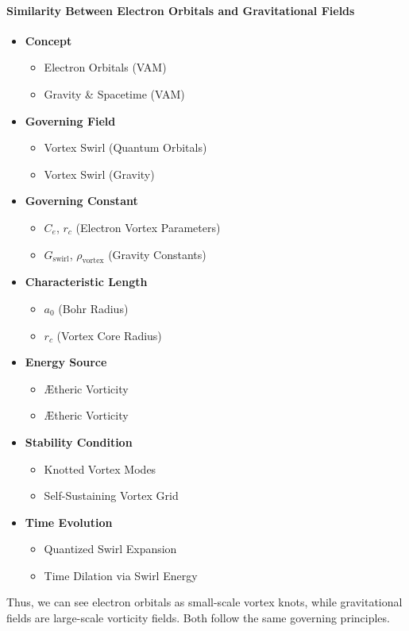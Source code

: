 \documentclass[a4paper,10pt]{article}
\begin{document}
\paragraph{Similarity Between Electron Orbitals and Gravitational Fields}
\begin{itemize}
    \item \textbf{Concept}
    \begin{itemize}
        \item Electron Orbitals (VAM)
        \item Gravity \& Spacetime (VAM)
    \end{itemize}
    \item \textbf{Governing Field}
    \begin{itemize}
        \item Vortex Swirl (Quantum Orbitals)
        \item Vortex Swirl (Gravity)
    \end{itemize}
    \item \textbf{Governing Constant}
    \begin{itemize}
        \item $C_e$, $r_c$ (Electron Vortex Parameters)
        \item $ G_\text{swirl}$, $\rho_\text{vortex}$ (Gravity Constants)
    \end{itemize}
    \item \textbf{Characteristic Length}
    \begin{itemize}
        \item $a_0$ (Bohr Radius)
        \item $r_c$ (Vortex Core Radius)
    \end{itemize}
    \item \textbf{Energy Source}
    \begin{itemize}
        \item Ætheric Vorticity
        \item Ætheric Vorticity
    \end{itemize}
    \item \textbf{Stability Condition}
    \begin{itemize}
        \item Knotted Vortex Modes
        \item Self-Sustaining Vortex Grid
    \end{itemize}
    \item \textbf{Time Evolution}
    \begin{itemize}
        \item Quantized Swirl Expansion
        \item Time Dilation via Swirl Energy
    \end{itemize}
\end{itemize}
Thus, we can see electron orbitals as small-scale vortex knots, while gravitational fields are large-scale vorticity fields. Both follow the same governing principles.
\end{document}
